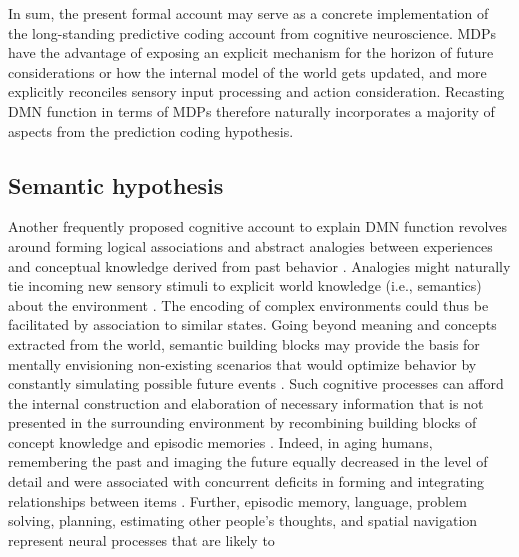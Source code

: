 \documentclass[10pt,letterpaper]{article}
\begin{document}
In sum,
the present formal account may serve as a concrete implementation of
the long-standing predictive coding account from cognitive neuroscience.
MDPs have the advantage of exposing an explicit
mechanism for the horizon of future considerations or
how the internal model of the world gets updated,
and
more explicitly reconciles sensory input processing and action consideration.
%
Recasting DMN function in terms of MDPs therefore naturally incorporates
a majority of aspects from the prediction coding hypothesis.



\subsection{Semantic hypothesis}
Another frequently proposed cognitive account to explain DMN function revolves
around forming logical associations and abstract analogies between
experiences and conceptual knowledge derived from past behavior
\citep{bar2007proactive, binder1999conceptual, constantinescu2016organizing}.
Analogies might naturally tie incoming new sensory stimuli to
explicit world knowledge (i.e., semantics) about the environment
\citep{bar2009proactive}.
The encoding of complex environments could thus be facilitated
by association to similar states.
%
Going beyond meaning and concepts extracted from the world,
semantic building blocks may provide the basis for
mentally envisioning non-existing scenarios
that would optimize behavior
by constantly simulating possible future events
\citep{boyer2008evolutionary, binder2011neurobiology}.
Such cognitive processes can afford
the internal construction and elaboration of necessary information
that is not presented in the surrounding environment
by recombining building blocks of
concept knowledge and episodic memories
\citep{hassabis2009construction}.
Indeed, in aging humans, remembering the past and imaging the future
equally decreased in the level of detail and were associated with
concurrent deficits in forming and integrating relationships between
items \citep{addis2008age, spreng2006temporal}.
Further,
episodic memory, language, problem solving,
planning, estimating other people's thoughts, and spatial navigation
represent neural processes that are likely to
\end{document}
